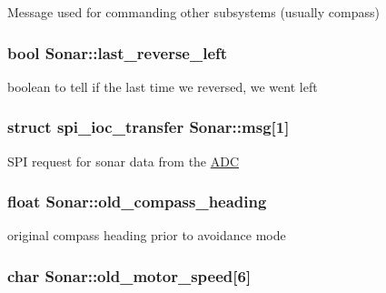 Message used for commanding other subsystems (usually compass) \hypertarget{classSonar_ad51a4f80202f692e4630f74490b5ef5d}{
\subsubsection[{last\-\_\-reverse\-\_\-left}]{\setlength{\rightskip}{0pt plus 5cm}bool Sonar\-::last\-\_\-reverse\-\_\-left\hspace{0.3cm}{\ttfamily [protected]}}}\label{classSonar_ad51a4f80202f692e4630f74490b5ef5d}
boolean to tell if the last time we reversed, we went left \hypertarget{classSonar_a29863f7d681d8119c233aa11398f65b7}{
\subsubsection[{msg}]{\setlength{\rightskip}{0pt plus 5cm}struct spi\-\_\-ioc\-\_\-transfer Sonar\-::msg\mbox{[}1\mbox{]}\hspace{0.3cm}{\ttfamily [protected]}}}\label{classSonar_a29863f7d681d8119c233aa11398f65b7}
S\-P\-I request for sonar data from the \hyperlink{classADC}{A\-D\-C} \hypertarget{classSonar_a223e1294a7e00208efcd2a80f57e7620}{
\subsubsection[{old\-\_\-compass\-\_\-heading}]{\setlength{\rightskip}{0pt plus 5cm}float Sonar\-::old\-\_\-compass\-\_\-heading\hspace{0.3cm}{\ttfamily [protected]}}}\label{classSonar_a223e1294a7e00208efcd2a80f57e7620}
original compass heading prior to avoidance mode \hypertarget{classSonar_a3ee55a9a946c5c00a68b3774c316728e}{
\subsubsection[{old\-\_\-motor\-\_\-speed}]{\setlength{\rightskip}{0pt plus 5cm}char Sonar\-::old\-\_\-motor\-\_\-speed\mbox{[}6\mbox{]}\hspace{0.3cm}{\ttfamily [protected]}}}\label{classSonar_a3ee55a9a946c5c00a68b3774c316728e}
